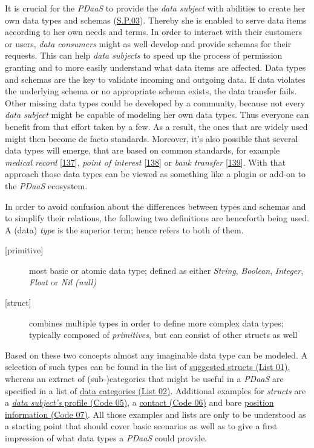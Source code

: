 \documentclass[12pt,english,a4paper,titlepage,cleardoublepage=empty,dottedtoc]{report}
\begin{document}
It is crucial for the \emph{PDaaS} to provide the \emph{data subject}
with abilities to create her own data types and schemas
(\protect\hyperlink{sp03}{S.P.03}). Thereby she is enabled to serve data
items according to her own needs and terms. In order to interact with
their customers or users, \emph{data consumers} might as well develop
and provide schemas for their requests. This can help \emph{data
subjects} to speed up the process of permission granting and to more
easily understand what data items are affected. Data types and schemas
are the key to validate incoming and outgoing data. If data violates the
underlying schema or no appropriate schema exists, the data transfer
fails. Other missing data types could be developed by a community,
because not every \emph{data subject} might be capable of modeling her
own data types. Thus everyone can benefit from that effort taken by a
few. As a result, the ones that are widely used might then become de
facto standards. Moreover, it's also possible that several data types
will emerge, that are based on common standards, for example
\emph{medical record}
{[}\protect\hyperlink{ref-web_spec_data-schemas_ehr}{137}{]},
\emph{point of interest}
{[}\protect\hyperlink{ref-web_spec_data-schemas_poi}{138}{]} or
\emph{bank transfer}
{[}\protect\hyperlink{ref-web_spec_data-schemas_bank-transfer}{139}{]}.
With that approach those data types can be viewed as something like a
plugin or add-on to the \emph{PDaaS} ecosystem.

In order to avoid confusion about the differences between types and
schemas and to simplify their relations, the following two definitions
are henceforth being used. A (data) \emph{type} is the superior term;
hence refers to both of them.

\begin{description}
\item[{[}primitive{]}]
most basic or atomic data type; defined as either \emph{String},
\emph{Boolean}, \emph{Integer}, \emph{Float} or \emph{Nil (null)}
\item[{[}struct{]}]
combines multiple types in order to define more complex data types;
typically composed of \emph{primitives}, but can consist of other
structs as well
\end{description}

Based on these two concepts almost any imaginable data type can be
modeled. A selection of such types can be found in the list of
\protect\hyperlink{list-01_suggested-structs}{suggested structs (List
01)}, whereas an extract of (sub-)categories that might be useful in a
\emph{PDaaS} are specified in a list of
\protect\hyperlink{list-02_data-categories}{data categories (List 02)}.
Additional examples for \emph{structs} are a
\protect\hyperlink{code-05_struct_profile}{\emph{data subject's} profile
(Code 05)}, a \protect\hyperlink{code-06_struct_contact}{contact (Code
06)} and bare \protect\hyperlink{code-07_struct_position}{position
information (Code 07)}. All those examples and lists are only to be
understood as a starting point that should cover basic scenarios as well
as to give a first impression of what data types a \emph{PDaaS} could
provide.
\end{document}
